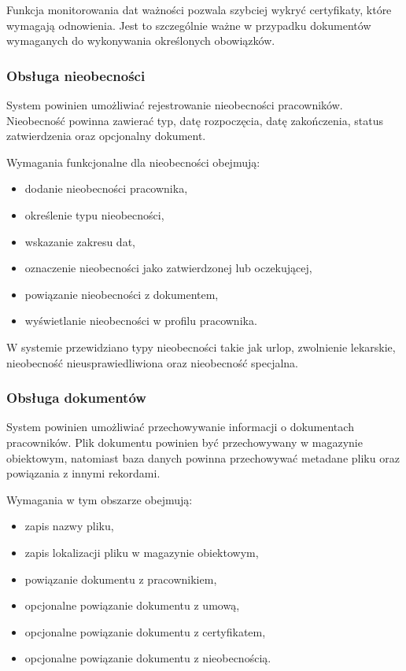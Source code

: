 Funkcja monitorowania dat ważności pozwala szybciej wykryć certyfikaty, które wymagają odnowienia. Jest to szczególnie ważne w przypadku dokumentów wymaganych do wykonywania określonych obowiązków.

\subsubsection{Obsługa nieobecności}

System powinien umożliwiać rejestrowanie nieobecności pracowników. Nieobecność powinna zawierać typ, datę rozpoczęcia, datę zakończenia, status zatwierdzenia oraz opcjonalny dokument.

Wymagania funkcjonalne dla nieobecności obejmują:
\begin{itemize}
    \item dodanie nieobecności pracownika,
    \item określenie typu nieobecności,
    \item wskazanie zakresu dat,
    \item oznaczenie nieobecności jako zatwierdzonej lub oczekującej,
    \item powiązanie nieobecności z dokumentem,
    \item wyświetlanie nieobecności w profilu pracownika.
\end{itemize}

W systemie przewidziano typy nieobecności takie jak urlop, zwolnienie lekarskie, nieobecność nieusprawiedliwiona oraz nieobecność specjalna.

\subsubsection{Obsługa dokumentów}

System powinien umożliwiać przechowywanie informacji o dokumentach pracowników. Plik dokumentu powinien być przechowywany w magazynie obiektowym, natomiast baza danych powinna przechowywać metadane pliku oraz powiązania z innymi rekordami.

Wymagania w tym obszarze obejmują:
\begin{itemize}
    \item zapis nazwy pliku,
    \item zapis lokalizacji pliku w magazynie obiektowym,
    \item powiązanie dokumentu z pracownikiem,
    \item opcjonalne powiązanie dokumentu z umową,
    \item opcjonalne powiązanie dokumentu z certyfikatem,
    \item opcjonalne powiązanie dokumentu z nieobecnością.
\end{itemize}

